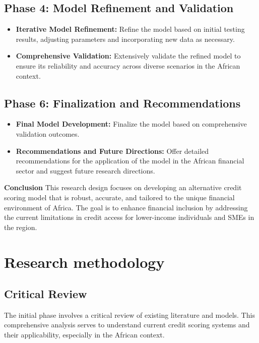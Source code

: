 \documentclass[a4paper,11pt,fleqn]{report}
\begin{document}
\subsection{Phase 4: Model Refinement and Validation}
\begin{itemize}
    \item \textbf{Iterative Model Refinement:} Refine the model based on initial testing results, adjusting parameters and incorporating new data as necessary.
    \item \textbf{Comprehensive Validation:} Extensively validate the refined model to ensure its reliability and accuracy across diverse scenarios in the African context.
\end{itemize}

\subsection{Phase 6: Finalization and Recommendations}
\begin{itemize}
    \item \textbf{Final Model Development:} Finalize the model based on comprehensive validation outcomes.
    \item \textbf{Recommendations and Future Directions:} Offer detailed recommendations for the application of the model in the African financial sector and suggest future research directions.
\end{itemize}

\textbf{Conclusion}
This research design focuses on developing an alternative credit scoring model that is robust, accurate, and tailored to the unique financial environment of Africa. The goal is to enhance financial inclusion by addressing the current limitations in credit access for lower-income individuals and SMEs in the region.

\section{Research methodology}



\subsection{Critical Review}
The initial phase involves a critical review of existing literature and models. This comprehensive analysis serves to understand current credit scoring systems and their applicability, especially in the African context.
\end{document}
